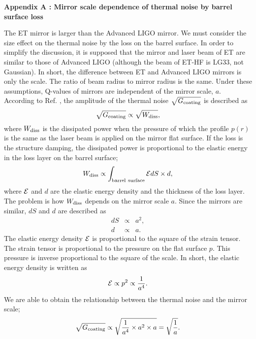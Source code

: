 \textbf{Appendix A : Mirror scale dependence of thermal noise by barrel surface loss}
\nopagebreak

The ET mirror is larger than the Advanced LIGO mirror. We must consider the
size effect on the thermal noise by the loss on the barrel surface. In order to
simplify the discussion, it is supposed that the mirror and laser
beam of ET are similar to those of Advanced LIGO (although the beam of ET-HF is 
LG33, not Gaussian). In short, the difference
between ET and Advanced LIGO mirrors is only the scale. The ratio of beam
radius to mirror radius is the same.
Under these assumptions, Q-values of mirrors are independent of the
mirror scale, $a$. According to Ref. \cite{Levin1998}, the amplitude
of the thermal noise $\sqrt{G_{\rm coating}}$ is described as
\begin{equation}
\sqrt{G_{\rm coating}} \propto \sqrt{W_{\rm diss}},
\label{Levin}
\end{equation}
where $W_{\rm diss}$ is the dissipated power when the pressure of
which the profile $p(r)$ is the same as the laser beam is applied
on the mirror flat surface. If the loss is the structure damping,
the dissipated power is proportional to the elastic energy in the
loss layer on the barrel surface;
\begin{equation}
W_{\rm diss} \propto \int_{\rm barrel\ surface} {\cal E} dS \times d,
\label{Wdiss}
\end{equation}
where ${\cal E}$ and $d$ are the elastic energy density and the thickness of
the loss layer. The problem is how $W_{\rm
diss}$ depends on the mirror scale $a$. Since the mirrors are
similar, $dS$ and $d$ are described as
\begin{eqnarray}
dS &\propto& a^2,\\
d &\propto& a.
\end{eqnarray}
The elastic energy density ${\cal E}$ is proportional to the
square of the strain tensor. The strain tensor is proportional to
the pressure on the flat surface $p$. This pressure is inverse
proportional to the square of the scale. In short, the elastic
energy density is written as
\begin{equation}
{\cal E} \propto p^2 \propto \frac1{a^4}.
\end{equation}
We are able to obtain the relationship between the thermal noise
and the mirror scale;
\begin{equation}
\sqrt{G_{\rm coating}} \propto \sqrt{\frac1{a^4} \times a^2 \times a} = \sqrt{\frac1{a}}.
\label{parametric instability size correction}
\end{equation}

